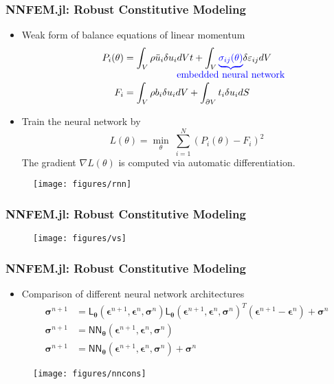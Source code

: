 \documentclass[usenames,dvipsnames]{beamer}
\newcommand{\ChoL}{\mathsf{L}}
\newcommand{\bt}[0]{\bm{\theta}}
\begin{document}
\begin{frame}
	\frametitle{NNFEM.jl: Robust Constitutive Modeling}
	\begin{itemize}
	 \item Weak form of balance equations of linear momentum 
	{\footnotesize
	\begin{align*}
		P_i(\theta) &= \int_V \rho \ddot u_i \delta u_i dVt + \int_{V} \textcolor{blue}{\underbrace{\textcolor{blue}{\sigma_{ij}(\theta)}}_{\mathclap{\textcolor{blue}{\mbox{embedded neural network}}}}} \delta \varepsilon_{ij}dV\\
		F_i &= \int_{V}\rho b_i \delta u_i dV + \int_{\partial V} t_i\delta u_idS
	\end{align*}
	}
	\item Train the neural network by 
	{\scriptsize $$\boxed{L(\theta) = \min_{\theta}\;\sum_{i=1}^N(P_i(\theta) - F_i)^2}$$}
	The gradient $\nabla L(\theta)$ is computed via automatic differentiation.
	\end{itemize}
	\begin{figure}[hbt]
  \texttt{[image: figures/rnn]}
\end{figure}

\end{frame}

\begin{frame}
	\frametitle{NNFEM.jl: Robust Constitutive Modeling}
\begin{figure}[hbt]
  \texttt{[image: figures/vs]}
\end{figure}
\end{frame}


\begin{frame}
	\frametitle{NNFEM.jl: Robust Constitutive Modeling}
	\begin{itemize}
		\item Comparison of different neural network architectures 
		\begin{align*}
			\bm\sigma^{n+1} &= \ChoL_{\bt}(\bm\epsilon^{n+1},\bm{\epsilon}^{n},\bm{\sigma}^{n}) \ChoL_{\bt}(\bm\epsilon^{n+1},\bm{\epsilon}^{n},\bm{\sigma}^{n})^T (\bm{\epsilon}^{n+1} - \bm{\epsilon}^{n})  + \bm{\sigma}^{n} \\
			\bm{\sigma}^{n+1} &=  \mathsf{NN}_{\bt}(\bm\epsilon^{n+1},\bm{\epsilon}^{n},\bm{\sigma}^{n})\\
			\bm{\sigma}^{n+1} &=  \mathsf{NN}_{\bt}(\bm\epsilon^{n+1},\bm{\epsilon}^{n},\bm{\sigma}^{n}) + \bm{\sigma}^{n}
		\end{align*}
	\end{itemize}
\begin{figure}[hbt]
  \texttt{[image: figures/nncons]}
\end{figure}
\end{frame}
\end{document}
